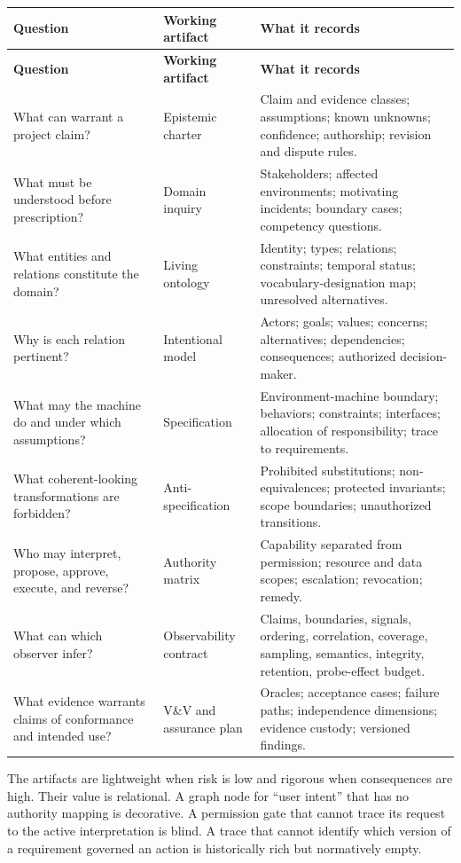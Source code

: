 \documentclass[10pt,a4paper]{article}
\begin{document}
\begin{longtable}{>{\raggedright\arraybackslash}p{}>{\raggedright\arraybackslash}p{}>{\raggedright\arraybackslash}p{}}
\hline
\textbf{Question} & \textbf{Working artifact} & \textbf{What it records} \\
\hline
\endfirsthead
\hline
\textbf{Question} & \textbf{Working artifact} & \textbf{What it records} \\
\hline
\endhead
What can warrant a project claim? & Epistemic charter & Claim and evidence classes; assumptions; known unknowns; confidence; authorship; revision and dispute rules. \\
What must be understood before prescription? & Domain inquiry & Stakeholders; affected environments; motivating incidents; boundary cases; competency questions. \\
What entities and relations constitute the domain? & Living ontology & Identity; types; relations; constraints; temporal status; vocabulary-designation map; unresolved alternatives. \\
Why is each relation pertinent? & Intentional model & Actors; goals; values; concerns; alternatives; dependencies; consequences; authorized decision-maker. \\
What may the machine do and under which assumptions? & Specification & Environment-machine boundary; behaviors; constraints; interfaces; allocation of responsibility; trace to requirements. \\
What coherent-looking transformations are forbidden? & Anti-specification & Prohibited substitutions; non-equivalences; protected invariants; scope boundaries; unauthorized transitions. \\
Who may interpret, propose, approve, execute, and reverse? & Authority matrix & Capability separated from permission; resource and data scopes; escalation; revocation; remedy. \\
What can which observer infer? & Observability contract & Claims, boundaries, signals, ordering, correlation, coverage, sampling, semantics, integrity, retention, probe-effect budget. \\
What evidence warrants claims of conformance and intended use? & V\&V and assurance plan & Oracles; acceptance cases; failure paths; independence dimensions; evidence custody; versioned findings. \\
\hline
\end{longtable}

The artifacts are lightweight when risk is low and rigorous when consequences are high. Their value is relational. A graph node for ``user intent'' that has no authority mapping is decorative. A permission gate that cannot trace its request to the active interpretation is blind. A trace that cannot identify which version of a requirement governed an action is historically rich but normatively empty.
\end{document}
